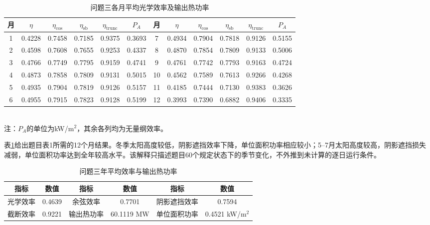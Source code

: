 \begin{table}[htbp]
  \centering
  \caption{问题三各月平均光学效率及输出热功率}
  \label{tab:q3-monthly}
  \scriptsize
  \setlength{\tabcolsep}{2.1pt}
  \begin{tabular}{c*{5}{c}@{\hspace{5pt}}c*{5}{c}}
    \toprule
    月 & $\eta$ & $\eta_{\mathrm{cos}}$ & $\eta_{\mathrm{sb}}$ & $\eta_{\mathrm{trunc}}$ & $P_A$
    & 月 & $\eta$ & $\eta_{\mathrm{cos}}$ & $\eta_{\mathrm{sb}}$ & $\eta_{\mathrm{trunc}}$ & $P_A$ \\
    \midrule
    1 & 0.4228 & 0.7458 & 0.7185 & 0.9375 & 0.3693 & 7  & 0.4934 & 0.7904 & 0.7818 & 0.9126 & 0.5155 \\
    2 & 0.4598 & 0.7608 & 0.7655 & 0.9253 & 0.4337 & 8  & 0.4870 & 0.7854 & 0.7809 & 0.9133 & 0.5006 \\
    3 & 0.4766 & 0.7749 & 0.7795 & 0.9159 & 0.4741 & 9  & 0.4761 & 0.7742 & 0.7793 & 0.9163 & 0.4724 \\
    4 & 0.4873 & 0.7858 & 0.7809 & 0.9131 & 0.5015 & 10 & 0.4562 & 0.7589 & 0.7613 & 0.9266 & 0.4268 \\
    5 & 0.4935 & 0.7904 & 0.7819 & 0.9126 & 0.5157 & 11 & 0.4185 & 0.7444 & 0.7130 & 0.9383 & 0.3626 \\
    6 & 0.4955 & 0.7915 & 0.7823 & 0.9128 & 0.5199 & 12 & 0.3993 & 0.7390 & 0.6882 & 0.9406 & 0.3335 \\
    \bottomrule
  \end{tabular}
  \\[2pt]
  \footnotesize 注：$P_A$的单位为kW/m$^2$，其余各列均为无量纲效率。
\end{table}

表\ref{tab:q3-monthly}给出题目表1所需的12个月结果。冬季太阳高度较低，阴影遮挡效率下降，单位面积功率相应较小；5--7月太阳高度较高，阴影遮挡损失减弱，单位面积功率达到全年较高水平。该解释只描述题目60个规定状态下的季节变化，不外推到未计算的逐日运行条件。

\begin{table}[htbp]
  \centering
  \caption{问题三年平均效率与输出热功率}
  \label{tab:q3-annual}
  \small
  \setlength{\tabcolsep}{5pt}
  \begin{tabular}{cccccc}
    \toprule
    指标 & 数值 & 指标 & 数值 & 指标 & 数值 \\
    \midrule
    光学效率 & 0.4639 & 余弦效率 & 0.7701 & 阴影遮挡效率 & 0.7594 \\
    截断效率 & 0.9221 & 输出热功率 & 60.1119 MW & 单位面积功率 & 0.4521 kW/m$^2$ \\
    \bottomrule
  \end{tabular}
\end{table}


